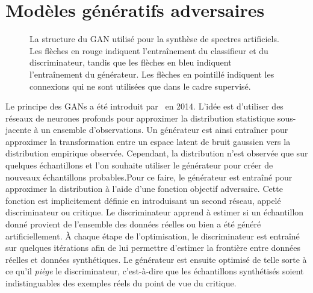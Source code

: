 \section{Modèles génératifs adversaires}

\begin{figure}
		\resizebox{\textwidth}{!}{}
    \caption{La structure du \gls{GAN} utilisé pour la synthèse de spectres artificiels. Les flèches en \textcolor{BrickRed}{rouge} indiquent l'entraînement du classifieur et du discriminateur, tandis que les flèches en \textcolor{NavyBlue}{bleu} indiquent l'entraînement du générateur. Les flèches en pointillé indiquent les connexions qui ne sont utilisées que dans le cadre supervisé.}
    \label{fig:gan}
\end{figure}

Le principe des \glspl{GAN} a été introduit par~\citet{goodfellow_generative_2014} en 2014. L'idée est d'utiliser des réseaux de neurones profonds pour approximer la distribution statistique sous-jacente à un ensemble d'observations. Un générateur est ainsi entraîner pour approximer la transformation entre un espace latent de bruit gaussien vers la distribution empirique observée. Cependant, la distribution n'est observée que sur quelques échantillons et l'on souhaite utiliser le générateur pour créer de nouveaux échantillons probables.Pour ce faire, le générateur est entraîné pour approximer la distribution à l'aide d'une fonction objectif adversaire. Cette fonction est implicitement définie en introduisant un second réseau, appelé discriminateur ou critique. Le discriminateur apprend à estimer si un échantillon donné provient de l'ensemble des données réelles ou bien a été généré artificiellement. À chaque étape de l'optimisation, le discriminateur est entraîné sur quelques itérations afin de lui permettre d'estimer la frontière entre données réelles et données synthétiques. Le générateur est ensuite optimisé de telle sorte à ce qu'il \emph{piège} le discriminateur, c'est-à-dire que les échantillons synthétisés soient indistinguables des exemples réels du point de vue du critique.

